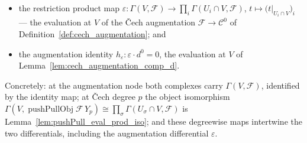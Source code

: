 \begin{lemma}
  \begin{itemize}
    \item the restriction product map \(\varepsilon : \Gamma(V, \mathcal{F}) \to
      \prod_i \Gamma(U_i \cap V, \mathcal{F})\), \(t \mapsto \bigl(t|_{U_i \cap V}\bigr)_i\)
      --- the evaluation at \(V\) of the {\v C}ech augmentation
      \(\mathcal{F} \to \mathcal{C}^0\) of Definition~\ref{def:cech_augmentation}; and
    \item the augmentation identity \(h_\varepsilon : \varepsilon \cdot d^0 = 0\), the
      evaluation at \(V\) of Lemma~\ref{lem:cech_augmentation_comp_d}.
  \end{itemize}
  Concretely: at the augmentation node both complexes carry \(\Gamma(V, \mathcal{F})\),
  identified by the identity map; at {\v C}ech degree \(p\) the object isomorphism
  \(\Gamma(V, \operatorname{pushPullObj}\mathcal{F}\,Y_p) \cong \prod_\sigma \Gamma(U_\sigma
  \cap V, \mathcal{F})\) is Lemma~\ref{lem:pushPull_eval_prod_iso}; and these degreewise maps
  intertwine the two differentials, including the augmentation differential \(\varepsilon\).
\end{lemma}
